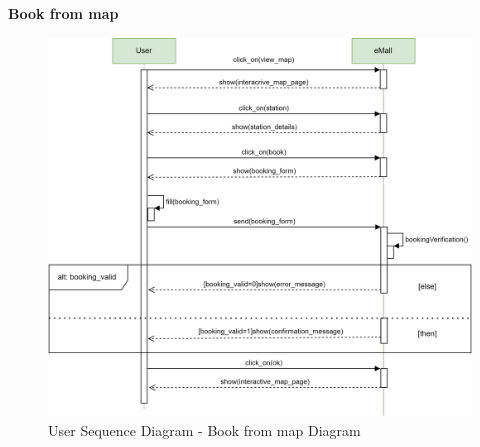\documentclass[table, 12pt]{article} %
\begin{document}
\begin{itemize}
            \newpage
            \textbf{Book from map}
            \begin{center}
                \begin{figure}[H]
                    \includegraphics[scale=0.55, center]{assets/sequenceDiagrams/Book from map.png}
                    \caption{User Sequence Diagram - Book from map Diagram}
                    \label{fig: Book from map}
                \end{figure}
            \end{center}


\end{itemize}
\end{document}
